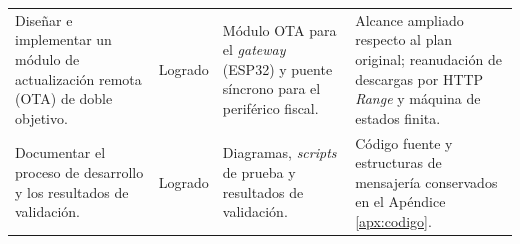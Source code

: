 \begin{table}[htbp]
\begin{tabularx}{\textwidth}{@{}>{\raggedright\arraybackslash}p{4.0cm} >{\raggedright\arraybackslash}p{2cm} >{\raggedright\arraybackslash}X >{\raggedright\arraybackslash}X@{}}
Diseñar e implementar un módulo de actualización remota (OTA) de doble objetivo. & Logrado & Módulo OTA para el \textit{gateway} (ESP32) y puente síncrono para el periférico fiscal. & Alcance ampliado respecto al plan original; reanudación de descargas por HTTP \textit{Range} y máquina de estados finita. \\
Documentar el proceso de desarrollo y los resultados de validación. & Logrado & Diagramas, \textit{scripts} de prueba y resultados de validación. & Código fuente y estructuras de mensajería conservados en el Apéndice \ref{apx:codigo}. \\
\bottomrule
\end{tabularx}
\end{table}